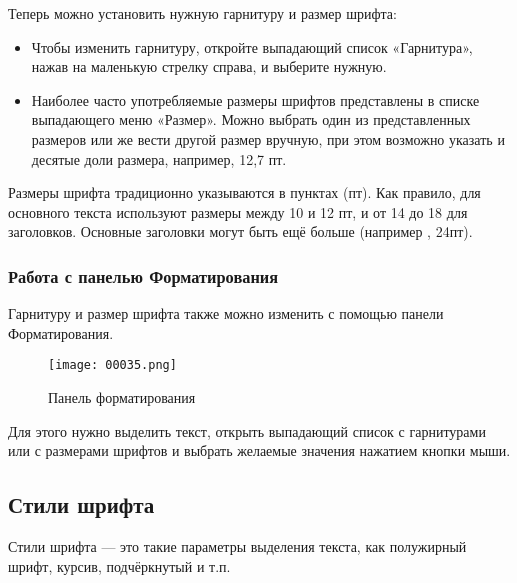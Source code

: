 \documentclass[a4paper,10pt]{article}
\begin{document}
Теперь можно установить нужную гарнитуру и размер шрифта:
\begin{itemize}
 \item Чтобы изменить гарнитуру, откройте выпадающий список «Гарнитура», нажав на маленькую стрелку справа, и выберите нужную.
 \item Наиболее часто употребляемые размеры шрифтов представлены в списке выпадающего меню «Размер». Можно выбрать один из представленных размеров или же вести другой размер вручную, при этом возможно указать и десятые доли размера, например, 12,7 пт.
\end{itemize}

Размеры шрифта традиционно указываются в пунктах (пт). Как правило, для основного текста используют размеры между 10 и 12 пт, и от 14 до 18 для заголовков. Основные заголовки могут быть ещё больше (например , 24пт).

\subsubsection{Работа с панелью Форматирования}
Гарнитуру и размер шрифта также можно изменить с помощью панели Форматирования.

\begin{figure}[ht]
\texttt{[image: 00035.png]}
\centering
\caption{Панель форматирования}
\end{figure}

Для этого нужно выделить текст, открыть выпадающий список с гарнитурами или с размерами шрифтов и выбрать желаемые значения нажатием кнопки мыши.

\subsection{Стили шрифта}
Стили шрифта — это такие параметры выделения текста, как полужирный шрифт, курсив, подчёркнутый и т.п. 
\end{document}
